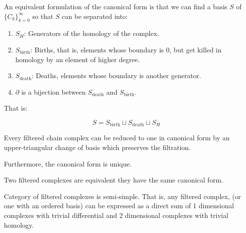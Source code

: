 \begin{remark}
\label{canonicalformsplit}
An equivalent formulation of the canonical form is that we can find a basis $S$ 
of $\{C_k\}_{k=0}^{\infty}$ so that $S$
can be separated into: 
\begin{enumerate}
\item $S_H$: Generators of the homology of the complex.

\item $S_{\text{birth}}$: Births, that is, elements whose boundary is $0$, but get killed in homology by an element of higher degree.

\item $S_{\text{death}}$: Deaths, elements whose boundary is another generator. 

\item $\partial$ is a bijection between $S_{\text{death}}$ 
and $S_{\text{birth}}$.
\end{enumerate}

That is:

$$
S=S_{\text{birth}}\sqcup
S_{\text{death}}\sqcup
 S_H
$$ 
\end{remark}

\begin{theorem}
\cite{bar1994}
\label{canonicalform}
Every filtered chain complex can be reduced to 
one in canonical form by an upper-triangular change of basis
which preserves the filtration.

Furthermore, the canonical form is unique.
\end{theorem}

%

%
%
%

\begin{corollary}
Two filtered complexes are equivalent
\ifff they have the same canonical form.
\end{corollary}


\begin{corollary}{Category of filtered complexes is semi-simple.}
That is, any filtered complex, (or one with an ordered basis) can be expressed as a direct sum of 
1 dimensional complexes with trivial differential and 2 dimensional complexes with trivial homology.
\end{corollary}

